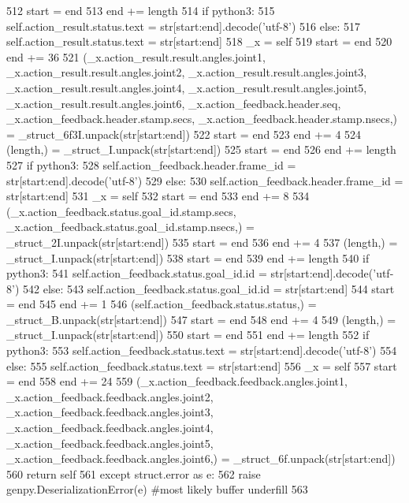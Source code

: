\begin{DoxyCode}
512       start = end
513       end += length
514       \textcolor{keywordflow}{if} python3:
515         self.action\_result.status.text = str[start:end].decode(\textcolor{stringliteral}{'utf-8'})
516       \textcolor{keywordflow}{else}:
517         self.action\_result.status.text = str[start:end]
518       \_x = self
519       start = end
520       end += 36
521       (\_x.action\_result.result.angles.joint1, \_x.action\_result.result.angles.joint2, 
      \_x.action\_result.result.angles.joint3, \_x.action\_result.result.angles.joint4, \_x.action\_result.result.angles.joint5, 
      \_x.action\_result.result.angles.joint6, \_x.action\_feedback.header.seq, \_x.action\_feedback.header.stamp.secs, 
      \_x.action\_feedback.header.stamp.nsecs,) = \_struct\_6f3I.unpack(str[start:end])
522       start = end
523       end += 4
524       (length,) = \_struct\_I.unpack(str[start:end])
525       start = end
526       end += length
527       \textcolor{keywordflow}{if} python3:
528         self.action\_feedback.header.frame\_id = str[start:end].decode(\textcolor{stringliteral}{'utf-8'})
529       \textcolor{keywordflow}{else}:
530         self.action\_feedback.header.frame\_id = str[start:end]
531       \_x = self
532       start = end
533       end += 8
534       (\_x.action\_feedback.status.goal\_id.stamp.secs, \_x.action\_feedback.status.goal\_id.stamp.nsecs,) = 
      \_struct\_2I.unpack(str[start:end])
535       start = end
536       end += 4
537       (length,) = \_struct\_I.unpack(str[start:end])
538       start = end
539       end += length
540       \textcolor{keywordflow}{if} python3:
541         self.action\_feedback.status.goal\_id.id = str[start:end].decode(\textcolor{stringliteral}{'utf-8'})
542       \textcolor{keywordflow}{else}:
543         self.action\_feedback.status.goal\_id.id = str[start:end]
544       start = end
545       end += 1
546       (self.action\_feedback.status.status,) = \_struct\_B.unpack(str[start:end])
547       start = end
548       end += 4
549       (length,) = \_struct\_I.unpack(str[start:end])
550       start = end
551       end += length
552       \textcolor{keywordflow}{if} python3:
553         self.action\_feedback.status.text = str[start:end].decode(\textcolor{stringliteral}{'utf-8'})
554       \textcolor{keywordflow}{else}:
555         self.action\_feedback.status.text = str[start:end]
556       \_x = self
557       start = end
558       end += 24
559       (\_x.action\_feedback.feedback.angles.joint1, \_x.action\_feedback.feedback.angles.joint2, 
      \_x.action\_feedback.feedback.angles.joint3, \_x.action\_feedback.feedback.angles.joint4, 
      \_x.action\_feedback.feedback.angles.joint5, \_x.action\_feedback.feedback.angles.joint6,) = \_struct\_6f.unpack(str[start:end])
560       \textcolor{keywordflow}{return} self
561     \textcolor{keywordflow}{except} struct.error \textcolor{keyword}{as} e:
562       \textcolor{keywordflow}{raise} genpy.DeserializationError(e) \textcolor{comment}{#most likely buffer underfill}
563 
\end{DoxyCode}
